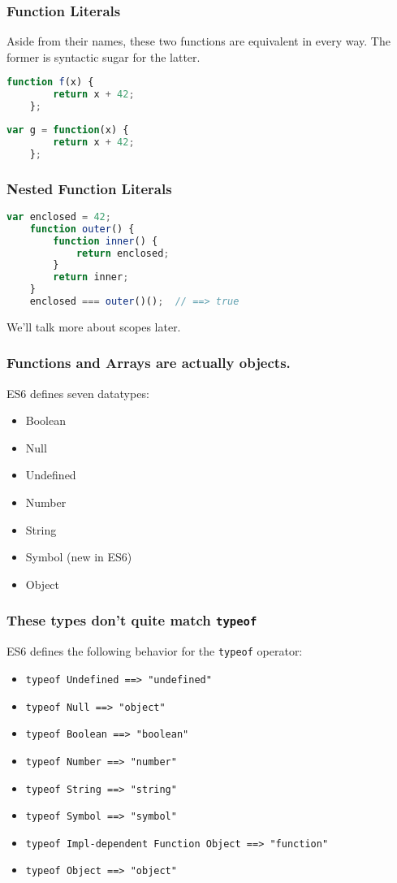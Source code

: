 \begin{frame}[fragile]
    \frametitle{Function Literals}

    Aside from their names, these two functions are equivalent in every way. The
    former is syntactic sugar for the latter.

    \begin{lstlisting}[language=JavaScript]
    function f(x) {
        return x + 42;
    };
    \end{lstlisting}

    \begin{lstlisting}[language=JavaScript]
    var g = function(x) {
        return x + 42;
    };
    \end{lstlisting}
\end{frame}

\begin{frame}[fragile]
    \frametitle{Nested Function Literals}
    \begin{lstlisting}[language=JavaScript]
    var enclosed = 42;
    function outer() {
        function inner() {
            return enclosed;
        }
        return inner;
    }
    enclosed === outer()();  // ==> true
    \end{lstlisting}
    We'll talk more about scopes later.
\end{frame}

\begin{frame}
    \frametitle{Functions and Arrays are actually objects.}
    ES6 defines seven datatypes:
    \begin{itemize}
        \item{Boolean}
        \item{Null}
        \item{Undefined}
        \item{Number}
        \item{String}
        \item{Symbol (new in ES6)}
        \item{Object}
    \end{itemize}
\end{frame}

\begin{frame}
    \frametitle{These types don't quite match \texttt{typeof}}
    ES6 defines the following behavior for the \texttt{typeof} operator:
    \begin{itemize}
        \item{\lstinline{typeof Undefined ==> "undefined"}}
        \item{\lstinline{typeof Null ==> "object"}}
        \item{\lstinline{typeof Boolean ==> "boolean"}}
        \item{\lstinline{typeof Number ==> "number"}}
        \item{\lstinline{typeof String ==> "string"}}
        \item{\lstinline{typeof Symbol ==> "symbol"}}
        \item{\lstinline{typeof Impl-dependent Function Object ==> "function"}}
        \item{\lstinline{typeof Object ==> "object"}}
    \end{itemize}
\end{frame}

